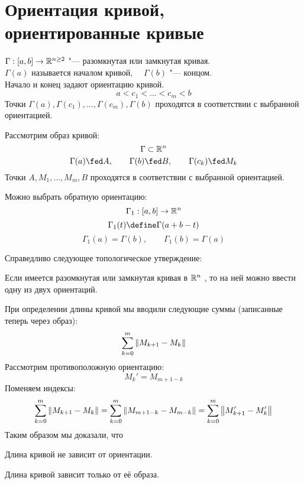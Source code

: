 \section{Ориентация кривой, ориентированные кривые}

\begin{definition}
	$ \Gamma : [a, b] \to \mathbb{R}^{n \ge 2} $ "--- разомкнутая или замкнутая кривая. \\
	$ \Gamma(a) $ называется началом кривой, $ \quad \Gamma(b) $ "--- концом. \\
	Начало и конец задают ориентацию кривой.
	$$ a < c_1 < \dots < c_m < b $$
	Точки $ \Gamma(a), \Gamma(c_1), \dots, \Gamma(c_m), \Gamma(b) $ проходятся в соответствии с выбранной ориентацией.
\end{definition}

Рассмотрим образ кривой:
$$ \Gamma \subset \mathbb{R}^n $$
$$ \Gamma(a) \fed A, \qquad \Gamma(b) \fed B, \qquad \Gamma(c_k) \fed M_k $$
Точки $ A, M_1, \dots, M_m, B $ проходятся в соответствии с выбранной ориентацией.

Можно выбрать \soc обратную ориентацию:
$$ \Gamma_1 : [a, b] \to \mathbb{R}^n $$
$$ \Gamma_1(t) \define \Gamma(a + b - t) $$
$$ \Gamma_1(a) = \Gamma(b), \qquad \Gamma_1(b) = \Gamma(a) $$

Справедливо следующее топологическое утверждение:

\begin{theorem}
	Если имеется разомкнутая или замкнутая кривая в $ \mathbb{R}^n $ , то на ней можно ввести одну из двух ориентаций.
\end{theorem}

\begin{noproof}
\end{noproof}

При определении длины кривой мы вводили следующие суммы (записанные теперь через образ):
$$ \sum_{k = 0}^m \left\|{M_{k + 1} - M_k}\right\| $$
Рассмотрим противоположную ориентацию:
$$ M_k' = M_{m + 1 - k} $$
Поменяем индексы:
$$ \sum_{k = 0}^m \left\|{M_{k + 1} - M_k}\right\| = \sum_{k = 0}^m \left\|{M_{m + 1 - k} - M_{m - k}}\right\| = \sum_{k = 0}^m \left\|{M_{k + 1}' - M_k'}\right\| $$
Таким образом мы доказали, что

\begin{statement}
	Длина кривой не зависит от ориентации.
\end{statement}

\begin{restate}
	Длина кривой зависит только от её образа.
\end{restate}

